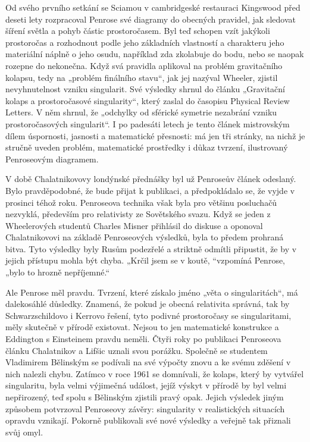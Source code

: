   Od svého prvního setkání se Sciamou v cambridgeské restauraci Kingswood před deseti lety
  rozpracoval Penrose své diagramy do obecných pravidel, jak sledovat šíření světla a pohyb částic
  prostoročasem. Byl teď schopen vzít jakýkoli prostoročas a rozhodnout podle jeho základních
  vlastností a charakteru jeho materiální náplně o jeho osudu, například zda zkolabuje do bodu, nebo
  se naopak rozepne do nekonečna. Když svá pravidla aplikoval na problém gravitačního kolapsu, tedy
  na „problém finálního stavu“, jak jej nazýval Wheeler, zjistil nevyhnutelnost vzniku singularit.
  Své výsledky shrnul do článku „Gravitační kolaps a prostoročasové singularity“, který zaslal do
  časopisu Physical Review Letters. V něm shrnul, že „odchylky od sférické symetrie nezabrání vzniku
  prostoročasových singularit“. I po padesáti letech je tento článek mistrovským dílem úspornosti,
  jasnosti a matematické přesnosti: má jen tři stránky, na nichž je stručně uveden problém,
  matematické prostředky i důkaz tvrzení, ilustrovaný Penroseovým diagramem. 

  V době Chalatnikovovy londýnské přednášky byl už Penroseův článek odeslaný. Bylo pravděpodobné, že
  bude přijat k publikaci, a předpokládalo se, že vyjde v prosinci téhož roku. Penroseova technika
  však byla pro většinu posluchačů nezvyklá, především pro relativisty ze Sovětského svazu. Když se
  jeden z Wheelerových studentů Charles Misner přihlásil do diskuse a oponoval Chalatnikovovi na
  základě Penroseových výsledků, byla to předem prohraná bitva. Tyto výsledky byly Rusům podezřelé a
  striktně odmítli připustit, že by v jejich přístupu mohla být chyba. „Krčil jsem se v koutě,
  “vzpomíná Penrose, „bylo to hrozně nepříjemné.“

  Ale Penrose měl pravdu. Tvrzení, které získalo jméno „věta o singularitách“, má dalekosáhlé
  důsledky. Znamená, že pokud je obecná relativita správná, tak by Schwarzschildovo i Kerrovo
  řešení, tyto podivné prostoročasy se singularitami, měly skutečně v přírodě existovat. Nejsou to
  jen matematické konstrukce a Eddington s Einsteinem pravdu neměli. Čtyři roky po publikaci
  Penroseova článku Chalatnikov a Lifšic uznali svou porážku. Společně se studentem Vladimirem
  Bělinským se podívali na své výpočty znovu a ke svému zděšení v nich nalezli chybu. Zatímco v roce
  1961 se domnívali, že kolaps, který by vytvářel singularitu, byla velmi výjimečná událost, jejíž
  výskyt v přírodě by byl velmi nepřirozený, teď spolu s Bělinským zjistili pravý opak. Jejich
  výsledek jiným způsobem potvrzoval Penroseovy závěry: singularity v realistických situacích
  opravdu vznikají. Pokorně publikovali své nové výsledky a veřejně tak přiznali svůj omyl. 

